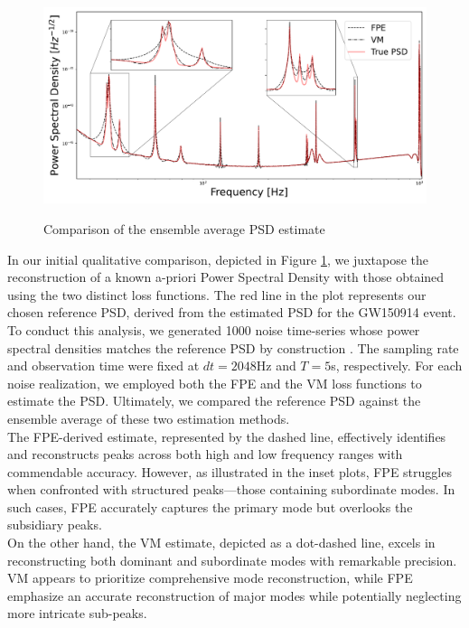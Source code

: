 \documentclass{aa}
\begin{document}
\begin{figure}
	\centering
	\includegraphics[width = \linewidth]{Images/Plots/comparison_loss2}
	\label{fig:psd_comparison}
	\caption{Comparison of the ensemble average PSD estimate}
\end{figure}
In our initial qualitative comparison, depicted in Figure \ref{fig:psd_comparison}, we juxtapose the reconstruction of a known a-priori Power Spectral Density with those obtained using the two distinct loss functions. The red line in the plot represents our chosen reference PSD, derived from the estimated PSD for the GW150914 event.\\ 
To conduct this analysis, we generated 1000 noise time-series whose power spectral densities matches the reference PSD by construction \citet{noiseGen}. The sampling rate and observation time were fixed at $dt = 2048$Hz and $T = 5$s, respectively. For each noise realization, we employed both the FPE and the VM loss functions to estimate the PSD. Ultimately, we compared the reference PSD against the ensemble average of these two estimation methods.\\
The FPE-derived estimate, represented by the dashed line, effectively identifies and reconstructs peaks across both high and low frequency ranges with commendable accuracy. However, as illustrated in the inset plots, FPE struggles when confronted with structured peaks—those containing subordinate modes. In such cases, FPE accurately captures the primary mode but overlooks the subsidiary peaks. \\ 
On the other hand, the VM estimate, depicted as a dot-dashed line, excels in reconstructing both dominant and subordinate modes with remarkable precision. VM appears to prioritize comprehensive mode reconstruction, while FPE emphasize an accurate reconstruction of major modes while potentially neglecting more intricate sub-peaks.
\end{document}
